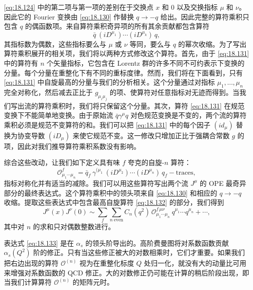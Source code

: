 \eqref{eq:18.124} 中的第二项与第一项的差别在于交换点 $x$ 和 0 以及交换指标 $\mu$ 和 $\nu$。因此它的 Fourier 变换由 \eqref{eq:18.130} 作替换 $q\to -q$ 给出。因此完整的算符乘积只包含 $q$ 的偶函数项。来自算符乘积奇异项的所有其余贡献都包含算符
\begin{equation}
  \bar{q}\ (iD^{\mu_1})\cdots(iD^{\mu_k})\,q ,
  \label{eq:18.131}
\end{equation}
其指标数为偶数，这些指标要么与 $\mu$ 或 $\nu$ 等同，要么与 $q$ 的幂次收缩。为了写出算符乘积展开的相关项，我们将以两种方式修改这个算符。首先，由于 \eqref{eq:18.131} 中的算符有 $n$ 个矢量指标，它包含在 Lorentz 群的许多不同不可约表示下变换的分量。每个分量在重整化下有不同的重标度律。然而，我们将在下面看到，只有 \eqref{eq:18.131} 中自旋最高的分量与我们的分析相关。这个分量通过对指标 $\mu_1, \ldots, \mu_n$ 完全对称化，然后减去正比于 $g_{\mu_i\mu_j}$ 的项、使算符对任意指标对无迹而得到。当我们写出流的算符乘积时，我们将只保留这个分量。其次，算符 \eqref{eq:18.131} 在规范变换下不能简单地变换。由于原始流 $\bar{q}\gamma^\mu q$ 对色规范变换是不变的，两个流的算符乘积必须是规范不变算符的和。我们可以把 \eqref{eq:18.131} 中的每个因子 $(id_{\mu})$ 替换为协变导数 $(iD_\mu)$ 来使它规范不变。这一修改只增加正比于强耦合常数 $g$ 的项，因此对我们推导算符乘积系数没有影响。

综合这些改动，让我们如下定义具有味 $f$ 夸克的自旋-$n$ 算符：
\begin{equation}
  \mathcal{O}^{f}_{\mu_1\cdots\mu_n} = \bar{q}_f\ \gamma^{(\mu_1}\
    (iD^{\mu_2})\cdots(iD^{\mu_n})\,q_f - \text{traces} ,
  \label{eq:18.132}
\end{equation}
指标对称化并有适当的减除。我们可以用这些算符写出两个流 $J^\mu$ 的 OPE 最奇异部分的最终表达式。这个算符乘积中的领头项来自 \eqref{eq:18.130} 和相应的 $q\to -q$ 收缩。提取这些表达式中包含最高自旋算符 \eqref{eq:18.132} 的部分，我们得到
\begin{equation}
  J^\mu(x)J^\nu(0) \sim \sum_f \sum_{n\ \text{even}} C_n(q^2)\,
    \mathcal{O}^{f\,\mu\nu}_{\mu_1\cdots\mu_n}\ q^{\mu_1}\cdots q^{\mu_n}
    + \cdots ,
  \label{eq:18.133}
\end{equation}
其中对 $n$ 的求和只对偶数整数进行。

表达式 \eqref{eq:18.133} 是在 $\alpha_s$ 的领头阶导出的。高阶费曼图将对系数函数贡献 $\alpha_s(Q^2)$ 阶的修正。只有当这些修正被大的对数相乘时，它们才重要。如果我们把右边出现的算符 $\mathcal{O}^{(n)}$ 视为在重整化标度 $Q$ 处归一化，就没有大的动量比可用来增强对系数函数的 QCD 修正。大的对数修正仍可能在计算的稍后阶段出现，即当我们计算算符 $\mathcal{O}^{(n)}$ 的矩阵元时。

